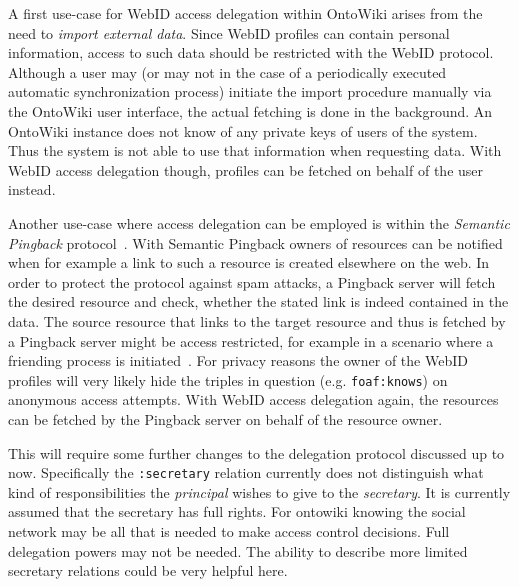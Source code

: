 \documentclass[a4paper]{llncs}
\begin{document}

A first use-case for WebID access delegation within OntoWiki arises from the need to \textit{import external data}.
Since WebID profiles can contain personal information, access to such data should be restricted with the WebID protocol.
Although a user may (or may not in the case of a periodically executed automatic synchronization process) initiate the import procedure manually via the OntoWiki user interface, the actual fetching is done in the background.
An OntoWiki instance does not know of any private keys of users of the system.
Thus the system is not able to use that information when requesting data.
With WebID access delegation though, profiles can be fetched on behalf of the user instead.

Another use-case where access delegation can be employed is within the \textit{Semantic Pingback} protocol~\cite{tramp-s-2010--b}.
With Semantic Pingback owners of resources can be notified when for example a link to such a resource is created elsewhere on the web.
In order to protect the protocol against spam attacks, a Pingback server will fetch the desired resource and check, whether the stated link is indeed contained in the data.
The source resource that links to the target resource and thus is fetched by a Pingback server might be access restricted, for example in a scenario where a friending process is initiated~\cite{story-h-2011--a}.
For privacy reasons the owner of the WebID profiles will very likely hide the triples in question (e.g. \texttt{foaf:knows}) on anonymous access attempts.
With WebID access delegation again, the resources can be fetched by the Pingback server on behalf of the resource owner.

This will require some further changes to the delegation protocol discussed up to now. 
Specifically the \lstinline|:secretary| relation currently does not distinguish what kind of responsibilities the \textit{principal} wishes to give to the \textit{secretary}. 
It is currently assumed that the secretary has full rights. For ontowiki knowing the social network may be all that is needed to make access control decisions. 
Full delegation powers may not be needed. The ability to describe more limited secretary relations could be very helpful here.
\end{document}
